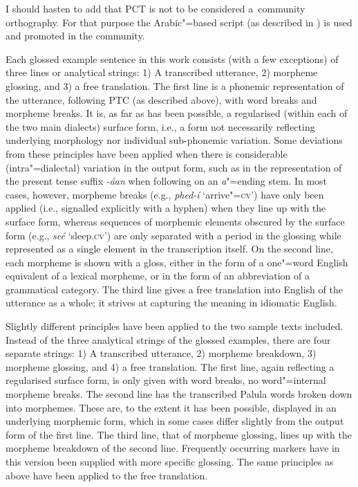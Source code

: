 {I should hasten to add that PCT is not to be considered a~community
orthography. For that purpose the Arabic"=based script (as described in ) is used and promoted in the community.


Each glossed example sentence in this work consists (with a few exceptions) of three lines or analytical strings: 1) A transcribed utterance, 2) morpheme glossing, and 3) a free translation. The first line is a phonemic representation of the utterance, following PTC (as described above), with word breaks and morpheme breaks. It is, as far as has been possible, a regularised (within each of the two main dialects) surface form, i.e., a form not necessarily reflecting underlying morphology nor individual sub-phonemic variation. Some deviations from these principles have been applied when there is considerable (intra"=dialectal) variation in the output form, such as in the representation of the present tense suffix \textit{-áan} when following on an \textit{a}"=ending stem. In most cases, however, morpheme breaks (e.g., \textit{phed-í} `arrive"=\textsc{cv}') have only been applied (i.e., signalled explicitly with a hyphen) when they line up with the surface form, whereas  sequences of morphemic elements obscured by the surface form (e.g., \textit{seé} `sleep.\textsc{cv}') are only separated with a period in the glossing while represented as a single element in the transcription itself. On the second line, each morpheme is shown with a gloss, either in the form of a one"=word English equivalent of a lexical morpheme, or in the form of an abbreviation of a grammatical category. The third line gives a free translation into English of the utterance as a whole; it strives at capturing the meaning in idiomatic English.


Slightly different principles have been applied to the two sample texts included. Instead of the three analytical strings of the glossed examples, there are four separate strings: 1) A transcribed utterance, 2) morpheme breakdown, 3) morpheme glossing, and 4) a free translation. The first line, again reflecting a regularised surface form, is only given with word breaks, no word"=internal morpheme breaks. The second line has the transcribed Palula words broken down into morphemes. These are, to the extent it has been possible, displayed in an underlying morphemic form, which in some cases differ slightly from the output form of the first line. The third line, that of morpheme glossing, lines up with the morpheme breakdown of the second line. Frequently occurring markers have in this version been supplied with more specific glossing. The same principles as above have been applied to the free translation. 

}
